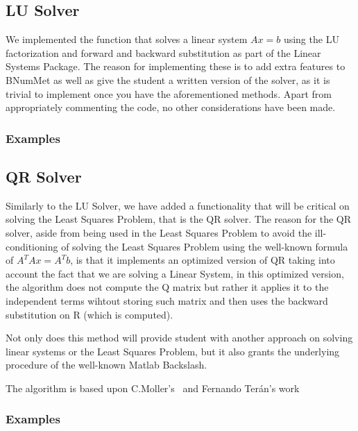 \subsection{LU Solver}
We implemented the function that solves a linear system $Ax=b$ using the LU factorization and forward and backward substitution as part of the Linear Systems Package. The reason for implementing these is to add extra features to BNumMet as well as give the student a written version of the solver, as it is trivial to implement once you have the aforementioned methods. Apart from appropriately commenting the code, no other considerations have been made.
\subsubsection{Examples}
	

\subsection{QR Solver}
Similarly to the LU Solver, we have added a functionality that will be critical on solving the Least Squares Problem, that is the QR solver. The reason for the QR solver, aside from being used in the Least Squares Problem to avoid the ill-conditioning of solving the Least Squares Problem using the well-known formula of $A^T A x= A^T b$, is that it implements an optimized version of QR taking into account the fact that we are solving a Linear System, in this optimized version, the algorithm does not compute the Q matrix but rather it applies it to the independent terms wihtout storing such matrix and then uses the backward substitution on R (which is computed).

Not only does this method will provide student with another approach on solving linear systems or the Least Squares Problem, but it also grants the underlying procedure of the well-known Matlab Backslash.

The algorithm is based upon C.Moller's~\cite{doi:10.1137/1.9780898717952} and Fernando Terán's work~\cite{Vergara}
\subsubsection{Examples}



